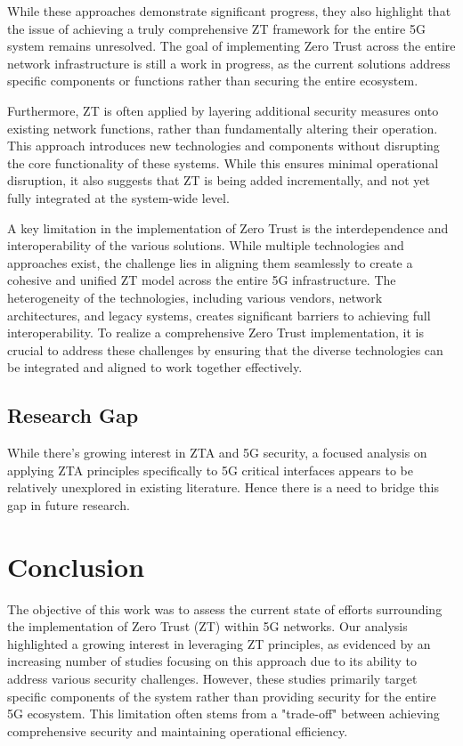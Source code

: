 \documentclass{report}
\begin{document}
    While these approaches demonstrate significant progress, they also highlight that the issue of achieving a truly comprehensive ZT framework for the entire 5G system remains unresolved. The goal of implementing Zero Trust across the entire network infrastructure is still a work in progress, as the current solutions address specific components or functions rather than securing the entire ecosystem.

    Furthermore, ZT is often applied by layering additional security measures onto existing network functions, rather than fundamentally altering their operation. This approach introduces new technologies and components without disrupting the core functionality of these systems. While this ensures minimal operational disruption, it also suggests that ZT is being added incrementally, and not yet fully integrated at the system-wide level.

    A key limitation in the implementation of Zero Trust is the interdependence and interoperability of the various solutions. While multiple technologies and approaches exist, the challenge lies in aligning them seamlessly to create a cohesive and unified ZT model across the entire 5G infrastructure. The heterogeneity of the technologies, including various vendors, network architectures, and legacy systems, creates significant barriers to achieving full interoperability. To realize a comprehensive Zero Trust implementation, it is crucial to address these challenges by ensuring that the diverse technologies can be integrated and aligned to work together effectively.

\subsection{Research Gap}
    While there's growing interest in ZTA and 5G security, a focused analysis on applying ZTA principles specifically to 5G critical interfaces appears to be relatively unexplored in existing literature. Hence there is a need to bridge this gap in future research.

\section{Conclusion}
    The objective of this work was to assess the current state of efforts surrounding the implementation of Zero Trust (ZT) within 5G networks. Our analysis highlighted a growing interest in leveraging ZT principles, as evidenced by an increasing number of studies focusing on this approach due to its ability to address various security challenges. However, these studies primarily target specific components of the system rather than providing security for the entire 5G ecosystem. This limitation often stems from a "trade-off" between achieving comprehensive security and maintaining operational efficiency.  
\end{document}
